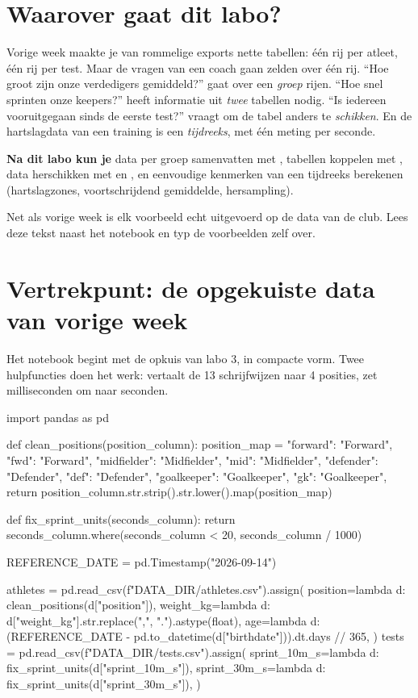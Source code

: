 \documentclass[11pt,a4paper]{article}
\author{dr. Maarten Slembrouck}
\begin{document}

\section*{Waarover gaat dit labo?}

Vorige week maakte je van rommelige exports nette tabellen: één rij per
atleet, één rij per test. Maar de vragen van een coach gaan zelden over
één rij. ``Hoe groot zijn onze verdedigers gemiddeld?'' gaat over een
\emph{groep} rijen. ``Hoe snel sprinten onze keepers?'' heeft informatie
uit \emph{twee} tabellen nodig. ``Is iedereen vooruitgegaan sinds de
eerste test?'' vraagt om de tabel anders te \emph{schikken}. En de
hartslagdata van een training is een \emph{tijdreeks}, met één meting per
seconde.

\textbf{Na dit labo kun je} data per groep samenvatten met
, tabellen koppelen met , data herschikken met
 en , en eenvoudige kenmerken van een
tijdreeks berekenen (hartslagzones, voortschrijdend gemiddelde,
hersampling).

Net als vorige week is elk voorbeeld echt uitgevoerd op de data van de
club. Lees deze tekst naast het notebook en typ de voorbeelden zelf over.

\section{Vertrekpunt: de opgekuiste data van vorige week}

Het notebook begint met de opkuis van labo 3, in compacte vorm. Twee
hulpfuncties doen het werk:  vertaalt de 13
schrijfwijzen naar 4 posities,  zet
milliseconden om naar seconden.

\begin{python}[noout]
import pandas as pd

def clean_positions(position_column):
    position_map = {
        "forward": "Forward", "fwd": "Forward",
        "midfielder": "Midfielder", "mid": "Midfielder",
        "defender": "Defender", "def": "Defender",
        "goalkeeper": "Goalkeeper", "gk": "Goalkeeper",
    }
    return position_column.str.strip().str.lower().map(position_map)

def fix_sprint_units(seconds_column):
    return seconds_column.where(seconds_column < 20, seconds_column / 1000)

REFERENCE_DATE = pd.Timestamp("2026-09-14")

athletes = pd.read_csv(f"{DATA_DIR}/athletes.csv").assign(
    position=lambda d: clean_positions(d["position"]),
    weight_kg=lambda d: d["weight_kg"].str.replace(",", ".").astype(float),
    age=lambda d: (REFERENCE_DATE - pd.to_datetime(d["birthdate"])).dt.days // 365,
)
tests = pd.read_csv(f"{DATA_DIR}/tests.csv").assign(
    sprint_10m_s=lambda d: fix_sprint_units(d["sprint_10m_s"]),
    sprint_30m_s=lambda d: fix_sprint_units(d["sprint_30m_s"]),
)
\end{python}
\end{document}
